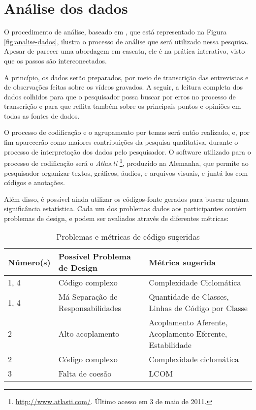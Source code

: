 \section{Análise dos dados}
\label{sec:planejamento-analise}

O procedimento de análise, baseado em \cite{creswell}, que está representado na
Figura \ref{fig:analise-dados}, ilustra o processo de análise que será utilizado
nessa pesquisa. Apesar de parecer uma abordagem em cascata, ele é na prática 
interativo, visto que os passos são interconectados. 

A princípio, os dados serão preparados, por meio de transcrição das
entrevistas e de observações feitas sobre os vídeos gravados. 
A seguir, a leitura completa dos
dados colhidos para que o pesquisador possa buscar por erros no processo de
transcrição e para que reflita também sobre os principais pontos e opiniões em
todas as fontes de dados.

O processo de codificação e o agrupamento
por temas será então realizado, e, por fim aparecerão como maiores
contribuições da pesquisa qualitativa, durante o processo de interpretação dos
dados pelo pesquisador. O software utilizado para o processo de codificação será
o \textit{Atlas.ti} \footnote{\url{http://www.atlasti.com/}. Último acesso em 3
de maio de 2011.}, produzido na Alemanha, que permite ao pesquisador organizar textos,
gráficos, áudios, e arquivos visuais, e juntá-los com códigos e anotações. 

Além disso, é possível ainda utilizar os códigos-fonte gerados para buscar alguma significância
estatística. Cada um dos problemas dados aos participantes contém problemas de design, e
podem ser avaliados através de diferentes métricas:

\begin{table}[h!]
	\begin{tabular}{ | p{2cm} | p{7cm} | p{6cm} | }
		\hline
		
		Número(s) & Possível Problema de Design & Métrica sugerida \\ \hline
		1, 4 & Código complexo & Complexidade Ciclomática \\ \hline
		1, 4 & Má Separação de Responsabilidades & Quantidade de Classes, Linhas de Código por Classe \\
		
		\hline
		
		2 & Alto acoplamento & Acoplamento Aferente, Acoplamento Eferente, Estabilidade \\ \hline
		2 & Código complexo & Complexidade ciclomática \\
		
		\hline
		
		3 & Falta de coesão & LCOM \\
		
		\hline
		
	\end{tabular}
	\caption{Problemas e métricas de código sugeridas}
\end{table}

